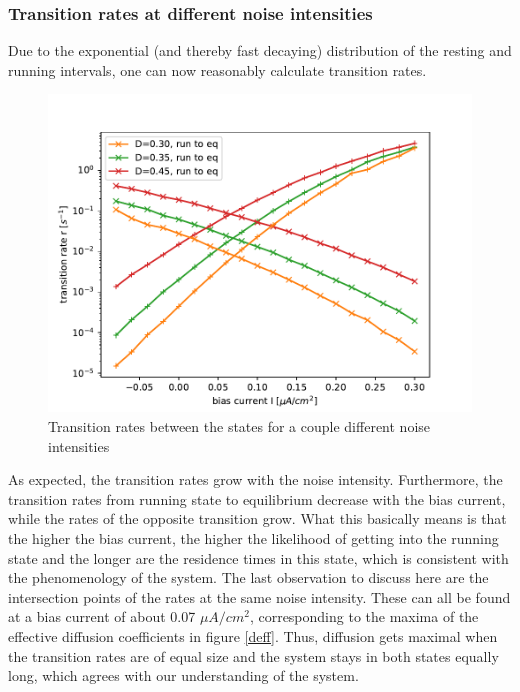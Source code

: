 \documentclass[12pt,a4paper]{article}
\begin{document}
\subsubsection{Transition rates at different noise intensities}
Due to the exponential (and thereby fast decaying) distribution of the resting and running intervals, one can now reasonably calculate transition rates.
\begin{figure}[H]
	\centering
	\includegraphics[scale=1]{tranratesneur31.pdf}\caption{Transition rates between the states for a couple different noise intensities}
	\label{tranrateneur}
\end{figure}
As expected, the transition rates grow with the noise intensity. Furthermore, the transition rates from running state to equilibrium decrease with the bias current, while the rates of the opposite transition grow. What this basically means is that the higher the bias current, the higher the likelihood of getting into the running state and the longer are the residence times in this state, which is consistent with the phenomenology of the system. The last observation to discuss here are the intersection points of the rates at the same noise intensity. These can all be found at a bias current of about 0.07 $\mu A/cm^2$, corresponding to the maxima of the effective diffusion coefficients in figure \ref{deff}. Thus, diffusion gets maximal when the transition rates are of equal size and the system stays in both states equally long, which agrees with our understanding of the system.
\end{document}
